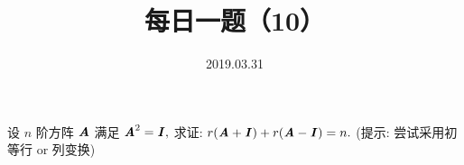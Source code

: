 \documentclass[UTF8]{ctexart}
\title{\textbf{每日一题（10）}}
\date{2019.03.31}
\begin{document}
\maketitle
设 $n$ 阶方阵 $\textbf{\textit{A}}$ 满足 $\textbf{\textit{A}}^2=\textbf{\textit{I}},$ 求证: $r(\textbf{\textit{A}}+\textbf{\textit{I}})+r(\textbf{\textit{A}}-\textbf{\textit{I}})=n.$ (提示: 尝试采用初等行 or 列变换)
\end{document}
